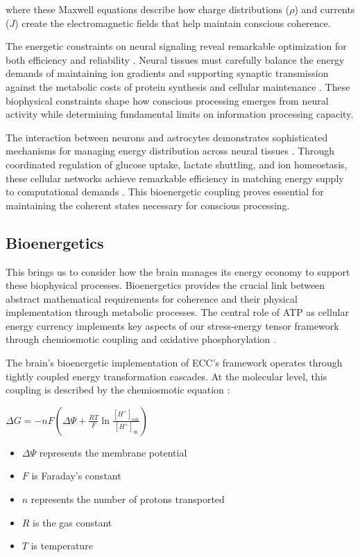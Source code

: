 \begin{refsection}
where these Maxwell equations describe how charge distributions ($\rho$) and currents ($J$) create the electromagnetic fields that help maintain conscious coherence.

The energetic constraints on neural signaling reveal remarkable optimization for both efficiency and reliability \cite{Attwell2001}. Neural tissues must carefully balance the energy demands of maintaining ion gradients and supporting synaptic transmission against the metabolic costs of protein synthesis and cellular maintenance \cite{Harris2012}. These biophysical constraints shape how conscious processing emerges from neural activity while determining fundamental limits on information processing capacity.

The interaction between neurons and astrocytes demonstrates sophisticated mechanisms for managing energy distribution across neural tissues \cite{Hertz2007}. Through coordinated regulation of glucose uptake, lactate shuttling, and ion homeostasis, these cellular networks achieve remarkable efficiency in matching energy supply to computational demands \cite{Magistretti2015}. This bioenergetic coupling proves essential for maintaining the coherent states necessary for conscious processing.

\subsection{Bioenergetics}

This brings us to consider how the brain manages its energy economy to support these biophysical processes. Bioenergetics provides the crucial link between abstract mathematical requirements for coherence and their physical implementation through metabolic processes. The central role of ATP as cellular energy currency implements key aspects of our stress-energy tensor framework through chemiosmotic coupling and oxidative phosphorylation \cite{Mitchell1961}.

The brain's bioenergetic implementation of ECC's framework operates through tightly coupled energy transformation cascades. At the molecular level, this coupling is described by the chemiosmotic equation \cite{Nicholls2013}:

$\Delta G = -nF(\Delta \Psi + \frac{RT}{F}\ln\frac{[H^+]_{\text{out}}}{[H^+]_{\text{in}}})$

\begin{itemize}
\item $\Delta \Psi$ represents the membrane potential
\item $F$ is Faraday's constant
\item $n$ represents the number of protons transported
\item $R$ is the gas constant
\item $T$ is temperature
\end{itemize}


\end{refsection}
